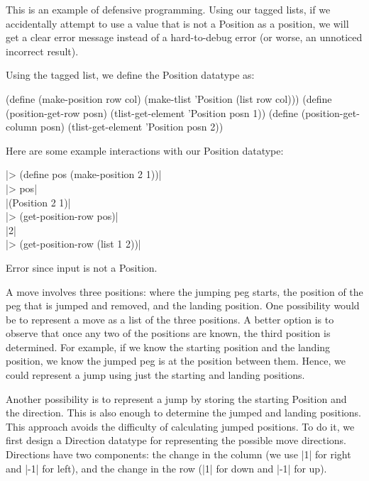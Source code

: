\begin{schemeregion}
{This is an example of defensive programming.  Using our tagged lists, if we accidentally attempt to use a value that is not a Position as a position, we will get a clear  error message instead of a hard-to-debug error (or worse, an unnoticed incorrect result).

Using the tagged list, we define the Position datatype as:
\begin{schemedisplay}		
(define (make-position row col) (make-tlist 'Position (list row col)))
(define (position-get-row posn) (tlist-get-element 'Position posn 1))
(define (position-get-column posn) (tlist-get-element 'Position posn 2))
\end{schemedisplay}

Here are some example interactions with our Position datatype:
\begin{code}
\scheme|> (define pos (make-position 2 1))|\\
\scheme|> pos|\\
\schemeresult|(Position 2 1)|\\
\scheme|> (get-position-row pos)|\\
\schemeresult|2|\\
\scheme|> (get-position-row (list 1 2))|\\
\begin{aside}Error since input is not a Position.\end{aside}
\end{code}

  A move involves three positions: where the jumping peg starts, the position of the peg that is jumped and removed, and the landing position.  One possibility would be to represent a move as a list of the three positions.  A better option is to observe that once any two of the positions are known, the third position is determined.  For example, if we know the starting position and the landing position, we know the jumped peg is at the position between them.  Hence, we could represent a jump using just the starting and landing positions.  

Another possibility is to represent a jump by storing the starting Position and the direction.  This is also enough to determine the jumped and landing positions.  This approach avoids the difficulty of calculating jumped positions.  To do it, we first design a Direction datatype for representing the possible move directions. Directions have two components: the change in the column (we use \scheme|1| for right and \scheme|-1| for left), and the change in the row (\scheme|1| for down and \scheme|-1| for up).  

}
\end{schemeregion}
